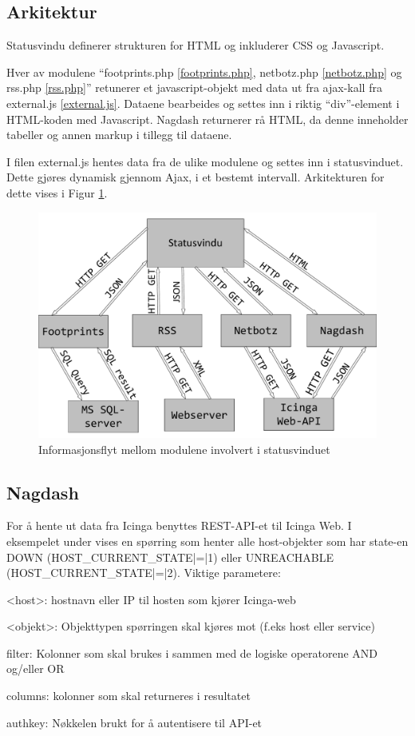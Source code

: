 \subsection{Arkitektur}

Statusvindu definerer strukturen for HTML og inkluderer CSS og Javascript.

Hver av modulene ``footprints.php \ref{footprints.php}, netbotz.php \ref{netbotz.php} og rss.php \ref{rss.php}'' retunerer et javascript-objekt med data ut fra ajax-kall fra external.js \ref{external.js}. Dataene bearbeides og settes inn i riktig ``div''-element i HTML-koden med Javascript. Nagdash returnerer rå HTML, da denne inneholder tabeller og annen markup i tillegg til dataene.

I filen external.js hentes data fra de ulike modulene og settes inn i statusvinduet. Dette gjøres dynamisk gjennom Ajax, i et bestemt intervall. Arkitekturen for dette vises i Figur \ref{statusvindu_arkitektur}.

\begin{figure}[H]
    \centering
    \includegraphics[scale=0.4]{img/statusvindu_arkitektur}
    \caption{Informasjonsflyt mellom modulene involvert i statusvinduet}
    \label{statusvindu_arkitektur}
\end{figure}


\subsection{Nagdash}

For å hente ut data fra Icinga benyttes REST-API-et til Icinga Web. I eksempelet under vises en spørring som henter alle host-objekter som har state-en DOWN (HOST\_CURRENT\_STATE|=|1) eller UNREACHABLE (HOST\_CURRENT\_STATE|=|2). Viktige parametere:
\begin{itemize*}
	\item <host>: hostnavn eller IP til hosten som kjører Icinga-web
	\item <objekt>: Objekttypen spørringen skal kjøres mot (f.eks host eller service)
	\item filter: Kolonner som skal brukes i sammen med de logiske operatorene AND og/eller OR
	\item columns: kolonner som skal returneres i resultatet
	\item authkey: Nøkkelen brukt for å autentisere til API-et
\end{itemize*}

